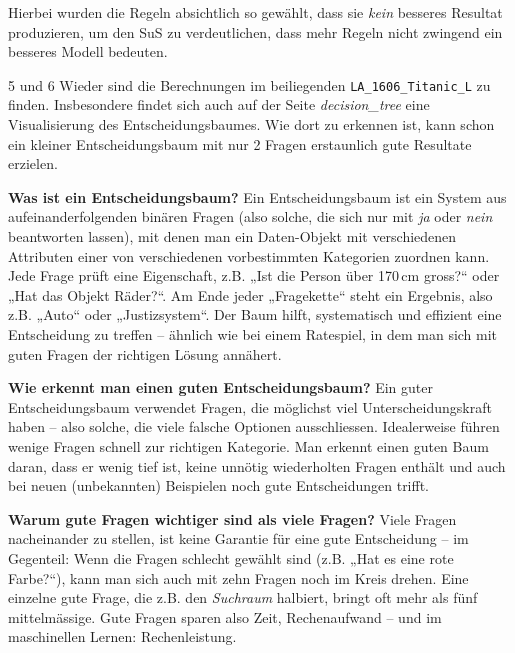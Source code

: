 Hierbei wurden die Regeln absichtlich so gewählt, dass sie \textit{kein} besseres Resultat produzieren, um den SuS zu verdeutlichen, dass mehr Regeln nicht zwingend ein besseres Modell bedeuten.

\begin{aufgabe}{5 und 6}
Wieder sind die Berechnungen im beiliegenden \texttt{LA\_1606\_Titanic\_L} zu finden. Insbesondere findet sich auch auf der Seite \textit{decision\_tree} eine Visualisierung des Entscheidungsbaumes. Wie dort zu erkennen ist, kann schon ein kleiner Entscheidungsbaum mit nur 2 Fragen erstaunlich gute Resultate erzielen.
\end{aufgabe}

\begin{aufgabe}{7}
\textbf{Was ist ein Entscheidungsbaum?}
Ein Entscheidungsbaum ist ein System aus aufeinanderfolgenden binären Fragen (also solche, die sich nur mit \textit{ja} oder \textit{nein} beantworten lassen), mit denen man ein Daten-Objekt mit verschiedenen Attributen einer von verschiedenen vorbestimmten Kategorien zuordnen kann. Jede Frage prüft eine Eigenschaft, z.B. „Ist die Person über 170 cm gross?“ oder „Hat das Objekt Räder?“. Am Ende jeder „Fragekette“ steht ein Ergebnis, also z.B. „Auto“ oder „Justizsystem“. Der Baum hilft, systematisch und effizient eine Entscheidung zu treffen – ähnlich wie bei einem Ratespiel, in dem man sich mit guten Fragen der richtigen Lösung annähert.

\textbf{Wie erkennt man einen guten Entscheidungsbaum?}
Ein guter Entscheidungsbaum verwendet Fragen, die möglichst viel Unterscheidungskraft haben – also solche, die viele falsche Optionen ausschliessen. Idealerweise führen wenige Fragen schnell zur richtigen Kategorie. Man erkennt einen guten Baum daran, dass er wenig tief ist, keine unnötig wiederholten Fragen enthält und auch bei neuen (unbekannten) Beispielen noch gute Entscheidungen trifft.

\textbf{Warum gute Fragen wichtiger sind als viele Fragen?}
Viele Fragen nacheinander zu stellen, ist keine Garantie für eine gute Entscheidung – im Gegenteil: Wenn die Fragen schlecht gewählt sind (z.B. „Hat es eine rote Farbe?“), kann man sich auch mit zehn Fragen noch im Kreis drehen. Eine einzelne gute Frage, die z.B. den \textit{Suchraum} halbiert, bringt oft mehr als fünf mittelmässige. Gute Fragen sparen also Zeit, Rechenaufwand – und im maschinellen Lernen: Rechenleistung.
\end{aufgabe}